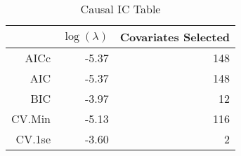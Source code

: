 \begin{table}[ht]
\centering
\begin{tabular}{rrr}
  \hline
 & $\log(\lambda)$ & Covariates Selected \\ 
  \hline
AICc & -5.37 & 148 \\ 
  AIC & -5.37 & 148 \\ 
  BIC & -3.97 &  12 \\ 
  CV.Min & -5.13 & 116 \\ 
  CV.1se & -3.60 &   2 \\ 
   \hline
\end{tabular}
\caption{Causal IC Table} 
\label{tab:causal_ic}
\end{table}
